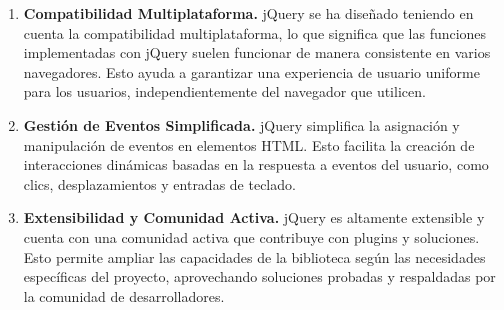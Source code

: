 \documentclass{article}
\begin{document}
\begin{itemize}
\begin{enumerate}
                    \item \textbf{Compatibilidad Multiplataforma.}
                    jQuery se ha diseñado teniendo en cuenta la compatibilidad multiplataforma, lo que significa que las funciones implementadas con jQuery suelen funcionar de manera consistente en varios navegadores. Esto ayuda a garantizar una experiencia de usuario uniforme para los usuarios, independientemente del navegador que utilicen.

                    \item \textbf{Gestión de Eventos Simplificada.}
                    jQuery simplifica la asignación y manipulación de eventos en elementos HTML. Esto facilita la creación de interacciones dinámicas basadas en la respuesta a eventos del usuario, como clics, desplazamientos y entradas de teclado.

                    \item \textbf{Extensibilidad y Comunidad Activa.}
                    jQuery es altamente extensible y cuenta con una comunidad activa que contribuye con plugins y soluciones. Esto permite ampliar las capacidades de la biblioteca según las necesidades específicas del proyecto, aprovechando soluciones probadas y respaldadas por la comunidad de desarrolladores.
                \end{enumerate}
            \end{itemize}
\end{document}
